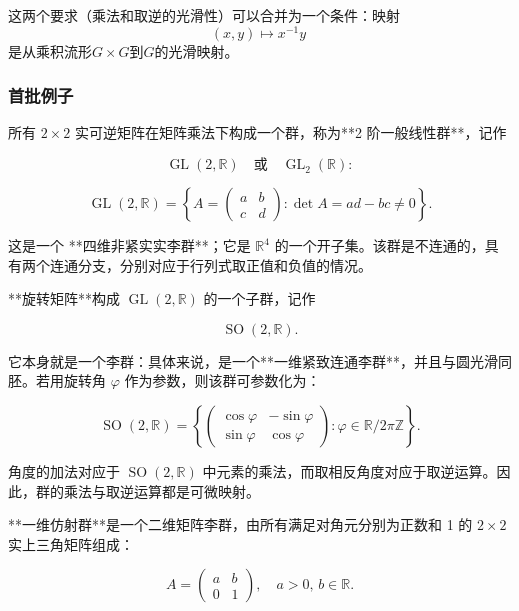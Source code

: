 这两个要求（乘法和取逆的光滑性）可以合并为一个条件：映射
$$
(x,y) \mapsto x^{-1}y~
$$
是从乘积流形$G \times G$到$G$的光滑映射。
\subsubsection{首批例子}
所有 $2 \times 2$ 实可逆矩阵在矩阵乘法下构成一个群，称为**2 阶一般线性群**，记作

$$
\operatorname{GL}(2,\mathbb{R}) \quad \text{或} \quad \operatorname{GL}_{2}(\mathbb{R}) :
$$

$$
\operatorname{GL}(2,\mathbb{R})=\left\{A=\begin{pmatrix}a & b \\ c & d\end{pmatrix} : \det A = ad - bc \neq 0 \right\}.
$$

这是一个 **四维非紧实实李群**；它是 $\mathbb{R}^4$ 的一个开子集。该群是不连通的，具有两个连通分支，分别对应于行列式取正值和负值的情况。

**旋转矩阵**构成 $\operatorname{GL}(2,\mathbb{R})$ 的一个子群，记作

$$
\operatorname{SO}(2,\mathbb{R}).
$$

它本身就是一个李群：具体来说，是一个**一维紧致连通李群**，并且与圆光滑同胚。若用旋转角 $\varphi$ 作为参数，则该群可参数化为：

$$
\operatorname{SO}(2,\mathbb{R})=\left\{\begin{pmatrix}\cos \varphi & -\sin \varphi \\ \sin \varphi & \cos \varphi \end{pmatrix} : \varphi \in \mathbb{R} / 2\pi\mathbb{Z}\right\}.
$$

角度的加法对应于 $\operatorname{SO}(2,\mathbb{R})$ 中元素的乘法，而取相反角度对应于取逆运算。因此，群的乘法与取逆运算都是可微映射。

**一维仿射群**是一个二维矩阵李群，由所有满足对角元分别为正数和 1 的 $2 \times 2$ 实上三角矩阵组成：

$$
A=\begin{pmatrix} a & b \\ 0 & 1 \end{pmatrix}, \quad a > 0, \, b \in \mathbb{R}.
$$
